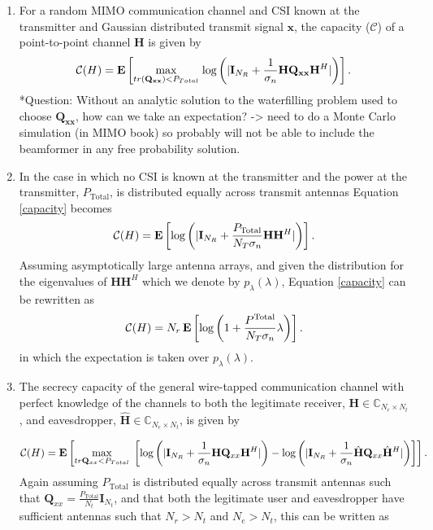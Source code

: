 \documentclass[12pt,a4paper]{report}
\begin{document}
\begin{enumerate}
\item For a random MIMO communication channel and CSI known at the transmitter and Gaussian distributed transmit signal $\mathbf{x}$, the capacity ($\mathcal{C}$) of a point-to-point channel $\mathbf{H}$ is given by
\begin{equation}\label{capacity}
\mathcal{C{}}{(H)} = \mathop{\bf E{}}\left[\underset{tr(\mathbf{Q}_{\mathbf{xx}}) < P_{Total}}{\mathrm{max}} \;\text{log{}}\left(|\mathbf{I}_{N_R}+\frac{1}{\sigma_n}\mathbf{H}\mathbf{Q}_{\mathbf{xx}}\mathbf{H}^H|\right)\right].
\end{equation}
*Question: Without an analytic solution to the waterfilling problem used to choose $\mathbf{Q}_{\mathbf{xx}}$, how can we take an expectation? -> need to do a Monte Carlo simulation (in MIMO book) so probably will not be able to include the beamformer in any free probability solution.

\item
In the case in which no CSI is known at the transmitter and the power at the transmitter, $P_{\text{Total}}$, is distributed equally across transmit antennas Equation \ref{capacity} becomes
\begin{equation}
\mathcal{C{}}{(H)} = \mathop{\bf E{}}\left[\text{log{}}\left(|\mathbf{I}_{N_R}+\frac{P_{\text{Total}}}{N_T \sigma_n}\mathbf{H}\mathbf{H}^H|\right)\right].
\end{equation} 
Assuming asymptotically large antenna arrays, and given the distribution for the eigenvalues of $\mathbf{H}\mathbf{H}^H$ which we denote by $p_{\lambda}(\lambda)$, Equation \ref{capacity} can be rewritten as 
\begin{equation}
\mathcal{C{}}{(H)} = N_r \mathop{\bf E{}}\left[\text{log{}}\left(1+\frac{P^{\text{Total}}}{N_T \sigma_n}\lambda\right)\right].
\end{equation}
 in which the expectation is taken over $p_{\lambda}(\lambda)$.

\item The secrecy capacity of the general wire-tapped communication channel with perfect knowledge of the channels to both the legitimate receiver, $\mathbf{H} \in \mathbb{C}_{N_r \times N_t}$, and eavesdropper, $\hat{\mathbf{H}}\in \mathbb{C}_{N_e \times N_t}$, is given by 

\begin{gather}\label{secrecy_capacity}
\mathcal{C{}}{(H)} = \mathop{\bf E{}}\left[\underset{tr{\mathbf{Q}_{xx}} < P_{Total}}{\mathrm{max}} \;\left[\text{log{}}\left(|\mathbf{I}_{N_R}+\frac{1}{\sigma_n}\mathbf{H}\mathbf{Q}_{xx}\mathbf{H}^H|\right) -
\text{log{}}\left(|\mathbf{I}_{N_R}+\frac{1}{\sigma_n}\hat{\mathbf{H}}\mathbf{Q}_{xx}\hat{\mathbf{H}}^H|\right)
\right] \right].
\end{gather}
Again assuming $P_{\text{Total}}$ is distributed equally across transmit antennas such that $\mathbf{Q}_{xx} = \frac{P_{\text{Total}}}{N_t}\mathbf{I}_{N_t}$, and that both the legitimate user and eavesdropper have sufficient antennas such that $N_r > N_t$ and $N_e >N_t$,  this can be written as 


\end{enumerate}
\end{document}

